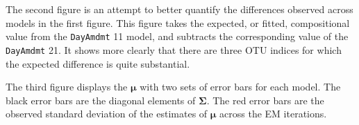 \documentclass{template}
\begin{document}
The second figure is an attempt to better quantify the differences observed across models in the first figure. This figure takes the expected, or fitted, compositional value from the \texttt{DayAmdmt} 11  model, and subtracts the corresponding value of the \texttt{DayAmdmt} 21. It shows more clearly that there are three OTU indices for which the expected difference  is quite substantial.


The third figure displays the $\boldsymbol{\mu}$ with two sets of error bars for each model. The black error bars are the diagonal elements of $\boldsymbol{\Sigma}$. The red error bars are the observed standard deviation of the estimates of $\boldsymbol{\mu}$ across the EM iterations.





\end{document}
